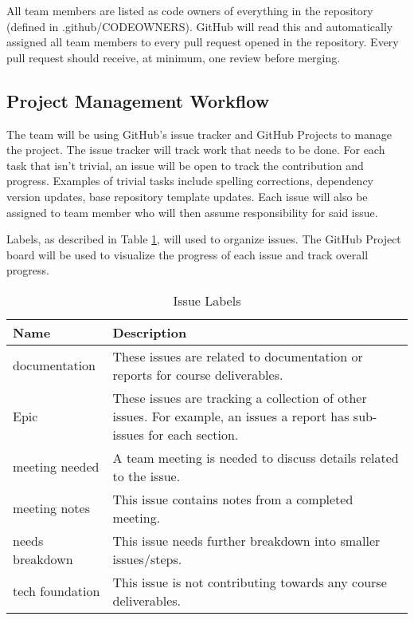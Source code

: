 \documentclass{article}
\begin{document}
All team members are listed as code owners of everything in the repository (defined in
.github/CODEOWNERS). GitHub will read this and automatically assigned all team members to every pull
request opened in the repository. Every pull request should receive, at minimum, one review before
merging.

\subsection{Project Management Workflow}

The team will be using GitHub's issue tracker and GitHub Projects to manage the project. The issue
tracker will track work that needs to be done. For each task that isn't trivial, an issue will be
open to track the contribution and progress. Examples of trivial tasks include spelling corrections,
dependency version updates, base repository template updates. Each issue will also be assigned to
team member who will then assume responsibility for said issue.

Labels, as described in Table \ref{issueLabels}, will used to organize issues. The GitHub Project
board will be used to visualize the progress of each issue and track overall progress.

\begin{table}[H]
  \centering
  \caption{Issue Labels}
  \vspace{5pt}
  \begin{tabular}{|p{}|p{}|}
      \hline
      \textbf{Name} & \textbf{Description}\\
      \hline
      documentation & These issues are related to documentation or reports for course deliverables.\\
      \hline
      Epic & These issues are tracking a collection of other issues. For example, an issues a report
      has sub-issues for each section.\\
      \hline
      meeting needed & A team meeting is needed to discuss details related to the issue.\\
      \hline
      meeting notes & This issue contains notes from a completed meeting.\\
      \hline
      needs breakdown & This issue needs further breakdown into smaller issues/steps.\\
      \hline
      tech foundation & This issue is not contributing towards any course deliverables.\\
      \hline
  \end{tabular}

  \label{issueLabels}
\end{table}
\end{document}
